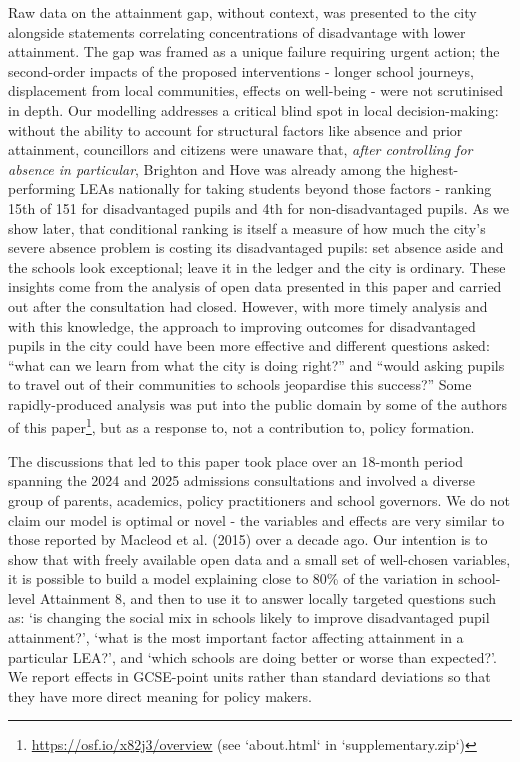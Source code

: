 \documentclass[
  12pt,
  titlepage]{article}
\begin{document}
Raw data on the attainment gap, without context, was presented to the
city alongside statements correlating concentrations of disadvantage
with lower attainment. The gap was framed as a unique failure requiring
urgent action; the second-order impacts of the proposed interventions -
longer school journeys, displacement from local communities, effects on
well-being - were not scrutinised in depth. Our modelling addresses a
critical blind spot in local decision-making: without the ability to
account for structural factors like absence and prior attainment,
councillors and citizens were unaware that, \emph{after controlling for
absence in particular}, Brighton and Hove was already among the
highest-performing LEAs nationally for taking students beyond those
factors - ranking 15th of 151 for disadvantaged pupils and 4th for
non-disadvantaged pupils. As we show later, that conditional ranking is
itself a measure of how much the city's severe absence problem is
costing its disadvantaged pupils: set absence aside and the schools look
exceptional; leave it in the ledger and the city is ordinary. These
insights come from the analysis of open data presented in this paper and
carried out after the consultation had closed. However, with more timely
analysis and with this knowledge, the approach to improving outcomes for
disadvantaged pupils in the city could have been more effective and
different questions asked: ``what can we learn from what the city is
doing right?'' and ``would asking pupils to travel out of their
communities to schools jeopardise this success?'' Some rapidly-produced
analysis was put into the public domain by some of the authors of this
paper\footnote{\url{https://osf.io/x82j3/overview} (see `about.html` in
  `supplementary.zip`)}, but as a response to, not a contribution to,
policy formation.

The discussions that led to this paper took place over an 18-month
period spanning the 2024 and 2025 admissions consultations and involved
a diverse group of parents, academics, policy practitioners and school
governors. We do not claim our model is optimal or novel - the variables
and effects are very similar to those reported by Macleod et al. (2015)
over a decade ago. Our intention is to show that with freely available
open data and a small set of well-chosen variables, it is possible to
build a model explaining close to 80\% of the variation in school-level
Attainment 8, and then to use it to answer locally targeted questions
such as: `is changing the social mix in schools likely to improve
disadvantaged pupil attainment?', `what is the most important factor
affecting attainment in a particular LEA?', and `which schools are doing
better or worse than expected?'. We report effects in GCSE-point units
rather than standard deviations so that they have more direct meaning
for policy makers.
\end{document}
